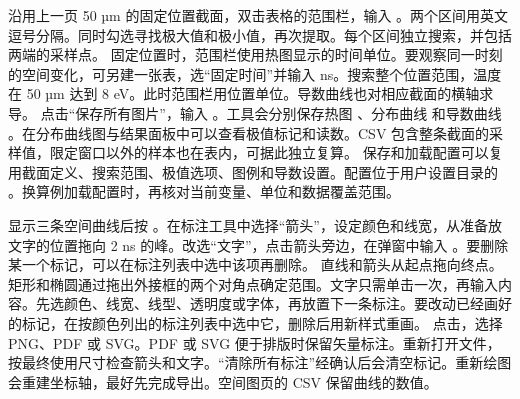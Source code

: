 沿用上一页 50 µm 的固定位置截面，双击表格的范围栏，输入 。两个区间用英文逗号分隔。同时勾选寻找极大值和极小值，再次提取。每个区间独立搜索，并包括两端的采样点。
固定位置时，范围栏使用热图显示的时间单位。要观察同一时刻的空间变化，可另建一张表，选“固定时间”并输入  ns。搜索整个位置范围，温度在 50 µm 达到 8 eV。此时范围栏用位置单位。导数曲线也对相应截面的横轴求导。
点击“保存所有图片”，输入 。工具会分别保存热图 、分布曲线  和导数曲线 。在分布曲线图与结果面板中可以查看极值标记和读数。CSV 包含整条截面的采样值，限定窗口以外的样本也在表内，可据此独立复算。
保存和加载配置可以复用截面定义、搜索范围、极值选项、图例和导数设置。配置位于用户设置目录的 。换算例加载配置时，再核对当前变量、单位和数据覆盖范围。

显示三条空间曲线后按 。在标注工具中选择“箭头”，设定颜色和线宽，从准备放文字的位置拖向 2 ns 的峰。改选“文字”，点击箭头旁边，在弹窗中输入 。要删除某一个标记，可以在标注列表中选中该项再删除。
直线和箭头从起点拖向终点。矩形和椭圆通过拖出外接框的两个对角点确定范围。文字只需单击一次，再输入内容。先选颜色、线宽、线型、透明度或字体，再放置下一条标注。要改动已经画好的标记，在按颜色列出的标注列表中选中它，删除后用新样式重画。
点击，选择 PNG、PDF 或 SVG。PDF 或 SVG 便于排版时保留矢量标注。重新打开文件，按最终使用尺寸检查箭头和文字。“清除所有标注”经确认后会清空标记。重新绘图会重建坐标轴，最好先完成导出。空间图页的 CSV 保留曲线的数值。



